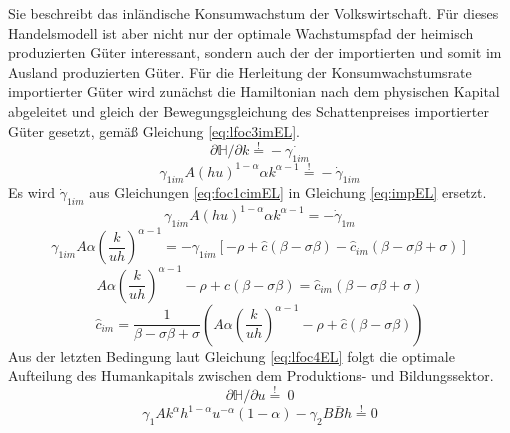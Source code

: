 Sie beschreibt das inländische Konsumwachstum der Volkswirtschaft. Für dieses Handelsmodell ist aber nicht nur der optimale Wachstumspfad der heimisch produzierten Güter interessant, sondern auch der der importierten und somit im Ausland produzierten Güter. Für die Herleitung der Konsumwachstumsrate importierter Güter wird zunächst die Hamiltonian nach dem physischen Kapital abgeleitet und gleich der Bewegungsgleichung des Schattenpreises importierter Güter gesetzt, gemä{\ss} Gleichung \eqref{eq:lfoc3imEL}.\\
\begin{equation*}
\partial\mathbb{H}/\partial k\overset{!}{=}-\dot{\gamma_{1im}}
\end{equation*}
\begin{equation}
\gamma_{1 im}A(hu)^{1- \alpha}\alpha k^{\alpha -1}\overset{!}{=} - \dot{\gamma}_{1im}\label{eq:impEL}
\end{equation}
Es wird $\dot{\gamma}_{1im}$  aus Gleichungen \eqref{eq:foc1cimEL} in Gleichung \eqref{eq:impEL} ersetzt. 
\begin{equation*}
\gamma_{1im}A(hu)^{1- \alpha}\alpha k^{\alpha -1} = - \dot{\gamma}_{1m}
\end{equation*}
\begin{equation*}
\gamma_{1im} A \alpha \left(\frac{k}{uh}\right)^{\alpha -1} = - \gamma_{1im} \left[- \rho + \hat{c} (\beta - \sigma\beta) - \hat{c}_{im} (\beta-\sigma\beta+ \sigma) \right]
\end{equation*}
\begin{equation*}
A \alpha \left(\frac{k}{uh}\right)^{\alpha -1} - \rho + \hat{c} (\beta - \sigma\beta) = \hat{c}_{im}(\beta-\sigma\beta+ \sigma)
\end{equation*}
\begin{equation}
\boxed{\hat{c}_{im}=\frac{1}{\beta-\sigma\beta+ \sigma}\left(A\alpha \left(\frac{k}{uh}\right)^{\alpha -1}-\rho+\hat{c}(\beta - \sigma\beta)\right)}\label{eq:lKRRim}
\end{equation}
Aus der letzten Bedingung laut Gleichung \eqref{eq:lfoc4EL} folgt die optimale Aufteilung des Humankapitals zwischen dem Produktions- und Bildungssektor. 
\begin{equation}
\partial\mathbb{H}/\partial u\overset{!}{=}~0
\label{eq:}
\end{equation}
\begin{equation}
\gamma_{1}Ak^{\alpha}h^{1- \alpha}u^{- \alpha} (1- \alpha) - \gamma_{2} B \bar{B} h\overset{!}{=}0
\end{equation}
\vspace{-0.7cm}
